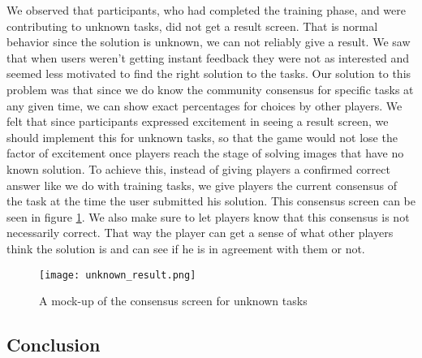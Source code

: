 We observed that participants, who had completed the training phase, and were contributing to unknown tasks, did not get a result screen. That is normal behavior since the solution is unknown, we can not reliably give a result. We saw that when users weren't getting instant feedback they were not as interested and seemed less motivated to find the right solution to the tasks. Our solution to this problem was that since we do know the community consensus for specific tasks at any given time, we can show exact percentages for choices by other players. We felt that since participants expressed excitement in seeing a result screen, we should implement this for unknown tasks, so that the game would not lose the factor of excitement once players reach the stage of solving images that have no known solution. To achieve this, instead of giving players a confirmed correct answer like we do with training tasks, we give players the current consensus of the task at the time the user submitted his solution. This consensus screen can be seen in figure \ref{fig:consensus}. We also make sure to let players know that this consensus is not necessarily correct. That way the player can get a sense of what other players think the solution is and can see if he is in agreement with them or not.

\begin{figure}[H]
	\centering
	\graphicspath{ {./graphics/} }
	\centerline{\texttt{[image: unknown\_result.png]}}
	\caption{\label{fig:consensus}A mock-up of the consensus screen for unknown tasks}
\end{figure}

\subsection{Conclusion}

